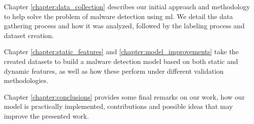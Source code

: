 Chapter \ref{chapter:data_collection} describes our initial approach and methodology to help solve the problem of malware detection using \gls{ml}. We detail the data gathering process and how it was analyzed, followed by the labeling process and dataset creation.

Chapter \ref{chapter:static_features} and \ref{chapter:model_improvements} take the created datasets to build a malware detection model based on both static and dynamic features, as well as how these perform under different validation methodologies.


Chapter \ref{chapter:conclusions} provides some final remarks on our work, how our model is practically implemented, contributions and possible ideas that may improve the presented work.
